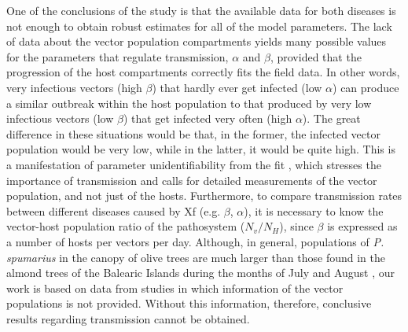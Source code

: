One of the conclusions of the study is that the available data for both
diseases is not enough to obtain robust estimates for all of the model
parameters. The lack of data about the vector population compartments yields
many possible values for the parameters that regulate transmission, $\alpha$
and $\beta$, provided that the progression of the host compartments correctly
fits the field data. In other words, very infectious vectors (high $\beta$)
that hardly ever get infected (low $\alpha$) can produce a similar outbreak
within the host population to that produced by very low infectious vectors (low
$\beta$) that get infected very often (high $\alpha$). The great difference in
these situations would be that, in the former, the infected vector population
would be very low, while in the latter, it would be quite high. This is a
manifestation of parameter unidentifiability from the fit
\cite{Chowel2017,Roosa2019}, which stresses the importance of transmission
and calls for detailed measurements of the vector population, and not just of
the hosts. Furthermore, to compare transmission rates between different
diseases caused by Xf (e.g. $\beta$, $\alpha$), it is necessary to know the
vector-host population ratio of the pathosystem ($N_v/N_H$), since $\beta$ is
expressed as a number of hosts per vectors per day. Although, in general,
populations of \textit{P. spumarius} in the canopy of olive trees are much
larger than those found in the almond trees of the Balearic Islands during the
months of July and August \cite{Lopez2021},
our work is based on data from studies in which information of the vector
populations is not provided. Without this information, therefore, conclusive
results regarding transmission cannot be obtained.

